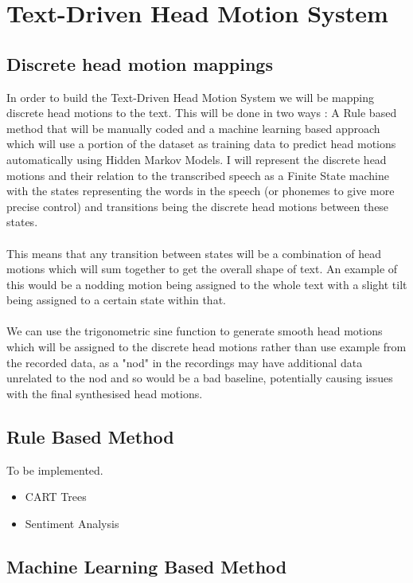 \documentclass[bsc,frontabs,twoside,singlespacing,parskip]{infthesis}
\begin{document}
\chapter{Text-Driven Head Motion System}
\section{Discrete head motion mappings}
In order to build the Text-Driven Head Motion System we will be mapping discrete head motions to the text. This will be done in two ways : A Rule based method that will be manually coded and a machine learning based approach which will use a portion of the dataset as training data to predict head motions automatically using Hidden Markov Models. I will represent the discrete head motions and their relation to the transcribed speech as a Finite State machine with the states representing the words in the speech (or phonemes to give more precise control) and transitions being the discrete head motions between these states. 
\\
\\
This means that any transition between states will be a combination of head motions which will sum together to get the overall shape of text. An example of this would be a nodding motion being assigned to the whole text with a slight tilt being assigned to a certain state within that.
\\
\\
We can use the trigonometric sine function to generate smooth head motions which will be assigned to the discrete head motions rather than use example from the recorded data, as a "nod" in the recordings may have additional data unrelated to the nod and so would be a bad baseline, potentially causing issues with the final synthesised head motions. 
\\
\section{Rule Based Method}
To be implemented.

\begin{itemize}
	\item{CART Trees}
	\item{Sentiment Analysis}
\end{itemize}

\section{Machine Learning Based Method}
\end{document}
